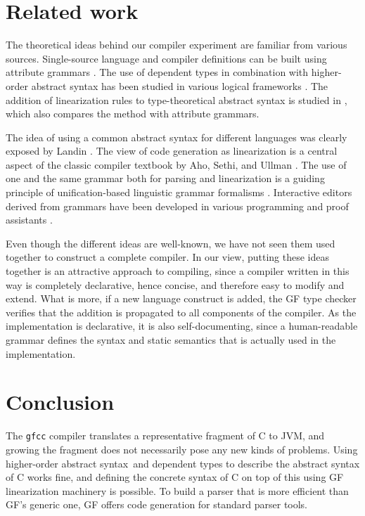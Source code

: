 \documentclass[12pt]{article}
\newcommand{\HOAS}{higher-order abstract syntax}
\begin{document}
\section{Related work}

The theoretical ideas behind our compiler experiment
are familiar from various sources.
Single-source language and compiler definitions
can be built using attribute grammars \cite{knuth-attr}.
The use of
dependent types in combination with higher-order abstract syntax
has been studied in various logical frameworks 
\cite{harper-honsell,magnusson-nordstr,twelf}.
The addition of linearization rules to type-theoretical 
abstract syntax is studied in \cite{semBNF}, which also 
compares the method with attribute grammars.

The idea of using a common abstract syntax for different 
languages was clearly exposed by Landin \cite{landin}. The view of
code generation as linearization is a central aspect of
the classic compiler textbook by Aho, Sethi, and Ullman
\cite{aho-ullman}. 
The use of one and the same grammar both for parsing and linearization
is a guiding principle of unification-based linguistic grammar 
formalisms \cite{pereira-shieber}. Interactive editors derived from
grammars have been developed in various programming and proof
assistants \cite{teitelbaum,metal,magnusson-nordstr}.

Even though the different ideas are well-known, 
we have not seen them used together to construct a complete
compiler. In our view, putting these ideas together is
an attractive approach to compiling, since a compiler written
in this way is completely declarative, hence concise, 
and therefore easy to modify and extend. What is more, if
a new language construct is added, the GF type checker
verifies that the addition is propagated to all components
of the compiler. As the implementation is declarative, 
it is also self-documenting, since a human-readable 
grammar defines the syntax and static
semantics that is actually used in the implementation.


\section{Conclusion}

The \texttt{gfcc} compiler translates a representative 
fragment of C to JVM, and growing the fragment
does not necessarily pose any new kinds of problems. 
Using \HOAS\ and dependent types to describe the abstract
syntax of C works fine, and defining the concrete syntax
of C on top of this using GF linearization machinery is 
possible. To build a parser that is more efficient than
GF's generic one, GF offers code generation for standard 
parser tools.
\end{document}
